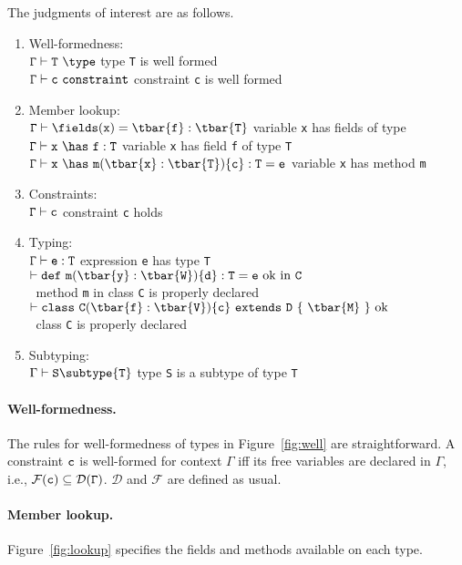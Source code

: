 The judgments of interest are as follows.
\begin{enumerate}
	\item Well-formedness:\\
	  $\tt\Gamma\vdash T~\type$ \hfill  type {\tt T} is well formed\\
	  $\tt\Gamma\vdash c~\constraint$ \hfill constraint {\tt c} is well formed
	\item Member lookup:\\
	  $\tt\Gamma\vdash \fields(x)=\tbar{f}:\tbar{T}$ \hfill variable {\tt x} has fields  of type \\
	  $\tt\Gamma\vdash x~\has~f:T$ \hfill variable {\tt x} has field {\tt f} of type {\tt T}\\
	  $\tt\Gamma\vdash x~\has~m(\tbar{x}:\tbar{T})\{c\}:T=e$ \hfill variable {\tt x} has method {\tt m}
	\item Constraints:\\
	  $\tt\Gamma\vdash c$ \hfill constraint {\tt c} holds
	\item Typing:\\
	  $\tt\Gamma\vdash e:T$ \hfill expression {\tt e} has type {\tt T}\\
	  $\tt\vdash def~m(\tbar{y}:\tbar{W})\{d\}:T=e~{\rm ok~in}~C$ \\ $~$ \hfill method {\tt m} in class {\tt C} is properly declared\\
	  $\tt\vdash class~C(\tbar{f}:\tbar{V})\{c\}~extends~D~\{~\tbar{M}~\}~\rm ok$ \\ $~$ \hfill class {\tt C} is properly declared
	\item Subtyping:\\
	  $\Gamma \vdash {\tt S} \subtype {\tt T}$ \hfill type {\tt S} is a subtype of type {\tt T}
\end{enumerate}

\paragraph{Well-formedness.} The rules for well-formedness of types in Figure~\ref{fig:well} are straightforward. A constraint $\tt c$ is well-formed for context $\Gamma$ iff its free variables are declared in $\Gamma$, i.e., $\tt\mathcal{F}(c)\subseteq\mathcal{D}(\Gamma)$. $\mathcal{D}$ and $\mathcal{F}$ are defined as usual.

\paragraph{Member lookup.} Figure~\ref{fig:lookup} specifies the fields and methods available on each type. %

